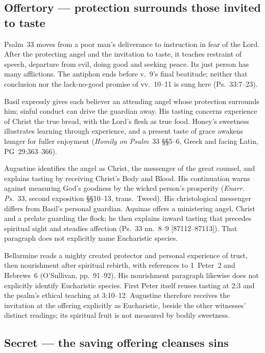 \subsection*{Offertory --- protection surrounds those invited to taste\enspace{}}\label{offertory-treatment}

Psalm~33 moves from a poor man's deliverance to instruction in fear of the
Lord. After the protecting angel and the invitation to taste, it teaches
restraint of speech, departure from evil, doing good and seeking peace.
Its just person has many afflictions. The antiphon ends before v.~9's final
beatitude; neither that conclusion nor the lack-no-good promise of vv.~10--11
is sung here (Ps.~33:7--23).

Basil expressly gives each believer an attending angel whose protection
surrounds him; sinful conduct can drive the guardian away. His tasting
concerns experience of Christ the true bread, with the Lord's flesh as true
food. Honey's sweetness illustrates learning through experience, and a
present taste of grace awakens hunger for fuller enjoyment
(\emph{Homily on Psalm}~33 §§5--6, Greek and facing Latin,
PG~29:363--366).

Augustine identifies the angel as Christ, the messenger of the great
counsel, and explains tasting by receiving Christ's Body and Blood. His
continuation warns against measuring God's goodness by the wicked person's
prosperity (\emph{Enarr. Ps.}~33, second exposition §§10--13,
trans.~Tweed). His christological messenger differs from Basil's personal
guardian. Aquinas offers a ministering angel, Christ and a prelate guarding
the flock; he then explains inward tasting that precedes spiritual sight and
steadies affection (Ps.~33 nn.~8--9 [87112--87113]). That paragraph does
not explicitly name Eucharistic species.

Bellarmine reads a mighty created protector and personal experience of trust,
then nourishment after spiritual rebirth, with references to 1~Peter~2 and
Hebrews~6 (O'Sullivan, pp.~91--92). His nourishment paragraph likewise does
not explicitly identify Eucharistic species. First Peter itself reuses
tasting at 2:3 and the psalm's ethical teaching at 3:10--12. Augustine
therefore receives the invitation at the offering explicitly as Eucharistic,
beside the other witnesses' distinct readings; its spiritual fruit is not
measured by bodily sweetness.

\subsection*{Secret --- the saving offering cleanses sins\enspace{}}\label{secret-treatment}


